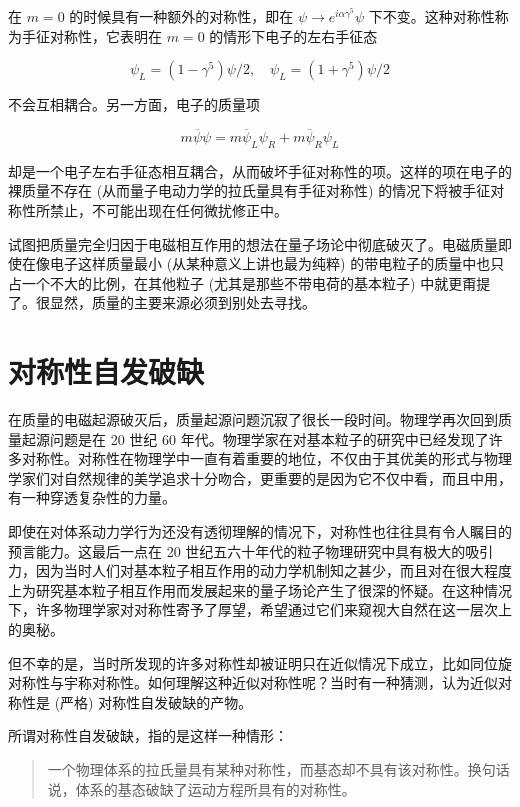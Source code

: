 \documentclass[oneside,a4paper,openany,11pt]{ctexbook}
\begin{document}
在 $m=0$ 的时候具有一种额外的对称性，即在 $\psi \to e^{i\alpha\gamma^5} \psi$ 下不变。这种对称性称为手征对称性，它表明在 $m=0$ 的情形下电子的左右手征态

\begin{equation}
    \psi_L = (1-\gamma^5) \psi/2, \quad \psi_L = (1+\gamma^5) \psi/2
\end{equation}

\noindent 不会互相耦合。另一方面，电子的质量项

\begin{equation}
    m \overline{\psi} \psi = m \overline{\psi}_L \psi_R + m \overline{\psi}_R \psi_L
\end{equation}

却是一个电子左右手征态相互耦合，从而破坏手征对称性的项。这样的项在电子的裸质量不存在 (从而量子电动力学的拉氏量具有手征对称性) 的情况下将被手征对称性所禁止，不可能出现在任何微扰修正中。

试图把质量完全归因于电磁相互作用的想法在量子场论中彻底破灭了。电磁质量即使在像电子这样质量最小 (从某种意义上讲也最为纯粹) 的带电粒子的质量中也只占一个不大的比例，在其他粒子 (尤其是那些不带电荷的基本粒子) 中就更甭提了。很显然，质量的主要来源必须到别处去寻找。

\section{对称性自发破缺}

在质量的电磁起源破灭后，质量起源问题沉寂了很长一段时间。物理学再次回到质量起源问题是在 20 世纪 60 年代。物理学家在对基本粒子的研究中已经发现了许多对称性。对称性在物理学中一直有着重要的地位，不仅由于其优美的形式与物理学家们对自然规律的美学追求十分吻合，更重要的是因为它不仅中看，而且中用，有一种穿透复杂性的力量。

即使在对体系动力学行为还没有透彻理解的情况下，对称性也往往具有令人瞩目的预言能力。这最后一点在 20 世纪五六十年代的粒子物理研究中具有极大的吸引力，因为当时人们对基本粒子相互作用的动力学机制知之甚少，而且对在很大程度上为研究基本粒子相互作用而发展起来的量子场论产生了很深的怀疑。在这种情况下，许多物理学家对对称性寄予了厚望，希望通过它们来窥视大自然在这一层次上的奥秘。

但不幸的是，当时所发现的许多对称性却被证明只在近似情况下成立，比如同位旋对称性与宇称对称性。如何理解这种近似对称性呢？当时有一种猜测，认为近似对称性是 (严格) 对称性自发破缺的产物。

所谓对称性自发破缺，指的是这样一种情形：

\begin{quote}
    一个物理体系的拉氏量具有某种对称性，而基态却不具有该对称性。换句话说，体系的基态破缺了运动方程所具有的对称性。
\end{quote}
\end{document}
